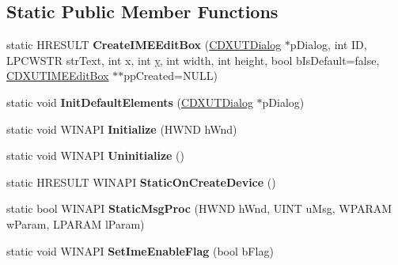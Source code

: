 \subsection*{Static Public Member Functions}
\begin{DoxyCompactItemize}
\item 
\hypertarget{class_c_d_x_u_t_i_m_e_edit_box_a443e8a7098285a5347b56e9760dbd099}{static H\+R\+E\+S\+U\+L\+T {\bfseries Create\+I\+M\+E\+Edit\+Box} (\hyperlink{class_c_d_x_u_t_dialog}{C\+D\+X\+U\+T\+Dialog} $\ast$p\+Dialog, int I\+D, L\+P\+C\+W\+S\+T\+R str\+Text, int x, int \hyperlink{_ice_utils_8h_aa7ffaed69623192258fb8679569ff9ba}{y}, int width, int height, bool b\+Is\+Default=false, \hyperlink{class_c_d_x_u_t_i_m_e_edit_box}{C\+D\+X\+U\+T\+I\+M\+E\+Edit\+Box} $\ast$$\ast$pp\+Created=N\+U\+L\+L)}\label{class_c_d_x_u_t_i_m_e_edit_box_a443e8a7098285a5347b56e9760dbd099}

\item 
\hypertarget{class_c_d_x_u_t_i_m_e_edit_box_a2b2d1b5c270694758d7841807b942f4e}{static void {\bfseries Init\+Default\+Elements} (\hyperlink{class_c_d_x_u_t_dialog}{C\+D\+X\+U\+T\+Dialog} $\ast$p\+Dialog)}\label{class_c_d_x_u_t_i_m_e_edit_box_a2b2d1b5c270694758d7841807b942f4e}

\item 
\hypertarget{class_c_d_x_u_t_i_m_e_edit_box_a73ffec7a2e4f87143781b825bf71bdbe}{static void W\+I\+N\+A\+P\+I {\bfseries Initialize} (H\+W\+N\+D h\+Wnd)}\label{class_c_d_x_u_t_i_m_e_edit_box_a73ffec7a2e4f87143781b825bf71bdbe}

\item 
\hypertarget{class_c_d_x_u_t_i_m_e_edit_box_a890b06b812034373b24a46d1d7b5fba5}{static void W\+I\+N\+A\+P\+I {\bfseries Uninitialize} ()}\label{class_c_d_x_u_t_i_m_e_edit_box_a890b06b812034373b24a46d1d7b5fba5}

\item 
\hypertarget{class_c_d_x_u_t_i_m_e_edit_box_ad8e3ce1bf80fbe0a2f5062ad92c48f33}{static H\+R\+E\+S\+U\+L\+T W\+I\+N\+A\+P\+I {\bfseries Static\+On\+Create\+Device} ()}\label{class_c_d_x_u_t_i_m_e_edit_box_ad8e3ce1bf80fbe0a2f5062ad92c48f33}

\item 
\hypertarget{class_c_d_x_u_t_i_m_e_edit_box_a24e3c4b6f5173c5ff5a4829d16e3c1c2}{static bool W\+I\+N\+A\+P\+I {\bfseries Static\+Msg\+Proc} (H\+W\+N\+D h\+Wnd, U\+I\+N\+T u\+Msg, W\+P\+A\+R\+A\+M w\+Param, L\+P\+A\+R\+A\+M l\+Param)}\label{class_c_d_x_u_t_i_m_e_edit_box_a24e3c4b6f5173c5ff5a4829d16e3c1c2}

\item 
\hypertarget{class_c_d_x_u_t_i_m_e_edit_box_aa3d979767fe6d73c5d16028588eb516b}{static void W\+I\+N\+A\+P\+I {\bfseries Set\+Ime\+Enable\+Flag} (bool b\+Flag)}\label{class_c_d_x_u_t_i_m_e_edit_box_aa3d979767fe6d73c5d16028588eb516b}

\end{DoxyCompactItemize}
